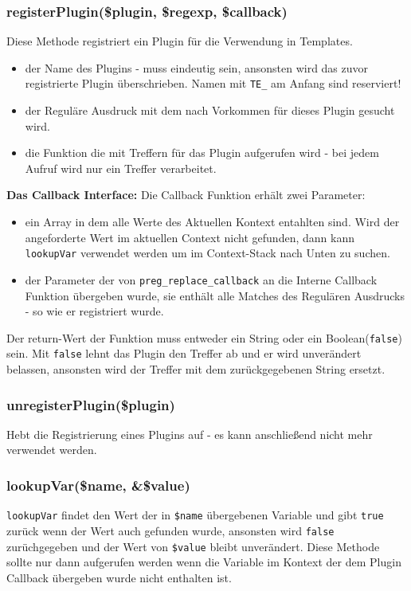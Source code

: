 \documentclass[a4paper,10pt]{article}
\begin{document}
\subsubsection{registerPlugin(\$plugin, \$regexp, \$callback)}
Diese Methode registriert ein Plugin f\"ur die Verwendung in Templates.
\begin{itemize}
  \item[\texttt{\$name}] der Name des Plugins - muss eindeutig sein, ansonsten wird das zuvor registrierte Plugin \"uberschrieben. Namen mit {\tt TE\_} am Anfang sind reserviert!
  \item[\texttt{\$regexp}] der Regul\"are Ausdruck mit dem nach Vorkommen f\"ur dieses Plugin gesucht wird.
  \item[\texttt{\$callback}] die Funktion die mit Treffern f\"ur das Plugin aufgerufen wird - bei jedem Aufruf wird nur ein Treffer verarbeitet.
\end{itemize}

{\bf Das Callback Interface:}\newline
Die Callback Funktion erh\"alt zwei Parameter:
\begin{itemize}
  \item[{\tt \$context}] ein Array in dem alle Werte des Aktuellen Kontext entahlten sind.
    Wird der angeforderte Wert im aktuellen Context nicht gefunden, dann kann {\tt lookupVar} verwendet werden um im Context-Stack nach Unten zu suchen.
  \item[{\tt \$match}] der Parameter der von {\tt preg\_replace\_callback} an die Interne Callback Funktion \"ubergeben wurde,
    sie enth\"alt alle Matches des Regul\"aren Ausdrucks - so wie er registriert wurde.
\end{itemize}
Der return-Wert der Funktion muss entweder ein String oder ein Boolean({\tt false}) sein. Mit {\tt false} lehnt das Plugin den Treffer ab und er wird unver\"andert belassen, ansonsten wird der Treffer mit dem zur\"uckgegebenen String ersetzt.

\subsubsection{unregisterPlugin(\$plugin)}
Hebt die Registrierung eines Plugins auf - es kann anschlie\ss{}end nicht mehr verwendet werden.

\subsubsection{lookupVar(\$name, \&\$value)}
{\tt lookupVar} findet den Wert der in {\tt \$name} \"ubergebenen Variable und gibt {\tt true} zur\"uck wenn der Wert
auch gefunden wurde, ansonsten wird {\tt false} zur\"uchgegeben und der Wert von {\tt \$value} bleibt unver\"andert.
Diese Methode sollte nur dann aufgerufen werden wenn die Variable im Kontext der dem Plugin Callback \"ubergeben wurde nicht enthalten ist.
\end{document}
